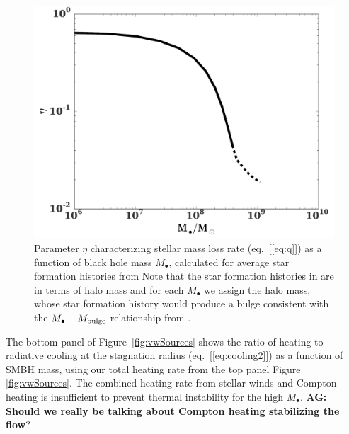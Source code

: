 \documentclass[usenatbib,fleqn]{mn2e}
\newcommand{\Mbh}[1][]{M_{\bullet#1}}
\begin{document}
\begin{figure}
\includegraphics[width=\columnwidth]{eta.pdf}
\caption{\label{fig:eta} Parameter $\eta$ characterizing stellar mass
  loss rate (eq.~[\ref{eq:q}]) as a function of black hole mass
  $\Mbh$, calculated for average star formation histories from
  \citet{MosterNaab+:2013a}  Note that the star
  formation histories in \citet{MosterNaab+:2013a} are in terms of
  halo mass and for each $\Mbh$ we assign the halo mass,
  whose star formation history would produce a bulge consistent with
  the $\Mbh-M_{\rm bulge}$ relationship from
  \citet{McConnellMa:2013a}.}
\end{figure}

The bottom panel of Figure~\ref{fig:vwSources} shows the ratio of
heating to radiative cooling at the stagnation radius
(eq.~[\ref{eq:cooling2}]) as a function of SMBH mass, using our total
heating rate from the top panel Figure \ref{fig:vwSources}.  The
combined heating rate from stellar winds and Compton heating is
insufficient to prevent thermal instability for the high $\Mbh$.
{\bf AG: Should we really be talking about Compton heating stabilizing
the flow}?


\end{document}
